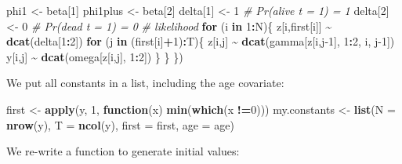 \documentclass[
  12pt,
]{krantz}
\newenvironment{Shaded}{\begin{snugshade}}{\end{snugshade}}
\newcommand{\AttributeTok}[1]{\textcolor[rgb]{0.13,0.29,0.53}{#1}}
\newcommand{\CommentTok}[1]{\textcolor[rgb]{0.56,0.35,0.01}{\textit{#1}}}
\newcommand{\ControlFlowTok}[1]{\textcolor[rgb]{0.13,0.29,0.53}{\textbf{#1}}}
\newcommand{\DecValTok}[1]{\textcolor[rgb]{0.00,0.00,0.81}{#1}}
\newcommand{\FunctionTok}[1]{\textcolor[rgb]{0.13,0.29,0.53}{\textbf{#1}}}
\newcommand{\NormalTok}[1]{#1}
\newcommand{\OtherTok}[1]{\textcolor[rgb]{0.56,0.35,0.01}{#1}}
\newcommand{\SpecialCharTok}[1]{\textcolor[rgb]{0.81,0.36,0.00}{\textbf{#1}}}
\begin{document}
\begin{Shaded}
\begin{Highlighting}[]
\NormalTok{  phi1 }\OtherTok{\textless{}{-}}\NormalTok{ beta[}\DecValTok{1}\NormalTok{]}
\NormalTok{  phi1plus }\OtherTok{\textless{}{-}}\NormalTok{ beta[}\DecValTok{2}\NormalTok{]}
\NormalTok{  delta[}\DecValTok{1}\NormalTok{] }\OtherTok{\textless{}{-}} \DecValTok{1}          \CommentTok{\# Pr(alive t = 1) = 1}
\NormalTok{  delta[}\DecValTok{2}\NormalTok{] }\OtherTok{\textless{}{-}} \DecValTok{0}          \CommentTok{\# Pr(dead t = 1) = 0}
  \CommentTok{\# likelihood}
  \ControlFlowTok{for}\NormalTok{ (i }\ControlFlowTok{in} \DecValTok{1}\SpecialCharTok{:}\NormalTok{N)\{}
\NormalTok{    z[i,first[i]] }\SpecialCharTok{\textasciitilde{}} \FunctionTok{dcat}\NormalTok{(delta[}\DecValTok{1}\SpecialCharTok{:}\DecValTok{2}\NormalTok{])}
    \ControlFlowTok{for}\NormalTok{ (j }\ControlFlowTok{in}\NormalTok{ (first[i]}\SpecialCharTok{+}\DecValTok{1}\NormalTok{)}\SpecialCharTok{:}\NormalTok{T)\{}
\NormalTok{      z[i,j] }\SpecialCharTok{\textasciitilde{}} \FunctionTok{dcat}\NormalTok{(gamma[z[i,j}\DecValTok{{-}1}\NormalTok{], }\DecValTok{1}\SpecialCharTok{:}\DecValTok{2}\NormalTok{, i, j}\DecValTok{{-}1}\NormalTok{])}
\NormalTok{      y[i,j] }\SpecialCharTok{\textasciitilde{}} \FunctionTok{dcat}\NormalTok{(omega[z[i,j], }\DecValTok{1}\SpecialCharTok{:}\DecValTok{2}\NormalTok{])}
\NormalTok{    \}}
\NormalTok{  \}}
\NormalTok{\})}
\end{Highlighting}
\end{Shaded}

We put all constants in a list, including the age covariate:

\begin{Shaded}
\begin{Highlighting}[]
\NormalTok{first }\OtherTok{\textless{}{-}} \FunctionTok{apply}\NormalTok{(y, }\DecValTok{1}\NormalTok{, }\ControlFlowTok{function}\NormalTok{(x) }\FunctionTok{min}\NormalTok{(}\FunctionTok{which}\NormalTok{(x }\SpecialCharTok{!=}\DecValTok{0}\NormalTok{)))}
\NormalTok{my.constants }\OtherTok{\textless{}{-}} \FunctionTok{list}\NormalTok{(}\AttributeTok{N =} \FunctionTok{nrow}\NormalTok{(y), }
                     \AttributeTok{T =} \FunctionTok{ncol}\NormalTok{(y), }
                     \AttributeTok{first =}\NormalTok{ first,}
                     \AttributeTok{age =}\NormalTok{ age)}
\end{Highlighting}
\end{Shaded}

We re-write a function to generate initial values:
\end{document}
